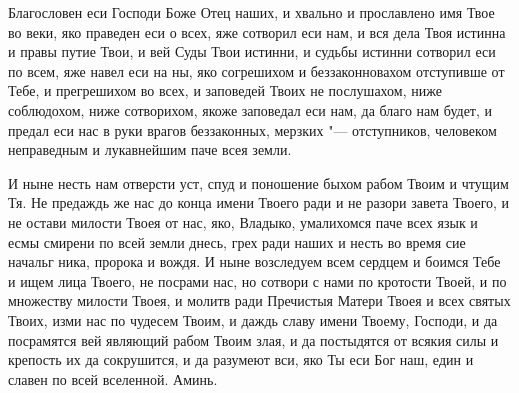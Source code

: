 \label{_content_zaotechestvo}


\begin{mymulticols}

Благословен еси Господи Боже Отец наших, и хвально и прославлено имя Твое во веки, яко праведен еси о всех, яже сотворил еси нам, и вся дела Твоя истинна и правы путие Твои, и вей Суды Твои истинни, и судьбы истинни сотворил еси по всем, яже навел еси на ны, яко согрешихом и беззаконновахом отступивше от Тебе, и прегрешихом во всех, и заповедей Твоих не послушахом, ниже соблюдохом, ниже сотворихом, якоже заповедал еси нам, да благо нам будет, и предал еси нас в руки врагов беззаконных, мерзких "--- отступников, человеком неправедным и лукавнейшим паче всея земли.

И ныне несть нам отверсти уст, спуд и поношение быхом рабом Твоим и чтущим Тя. Не предаждь же нас до конца имени Твоего ради и не разори завета Твоего, и не остави милости Твоея от нас, яко, Владыко, умалихомся паче всех язык и есмы смирени по всей земли днесь, грех ради наших и несть во время сие начальг ника, пророка и вождя. И ныне возследуем всем сердцем и боимся Тебе и ищем лица Твоего, не посрами нас, но сотвори с нами по кротости Твоей, и по множеству милости Твоея, и молитв ради Пречистыя Матери Твоея и всех святых Твоих, изми нас по чудесем Твоим, и даждь славу имени Твоему, Господи, и да посрамятся вей являющий рабом Твоим злая, и да постыдятся от всякия силы и крепость их да сокрушится, и да разумеют вси, яко Ты еси Бог наш, един и славен по всей вселенной. Аминь.

\end{mymulticols}

\mychapterending


